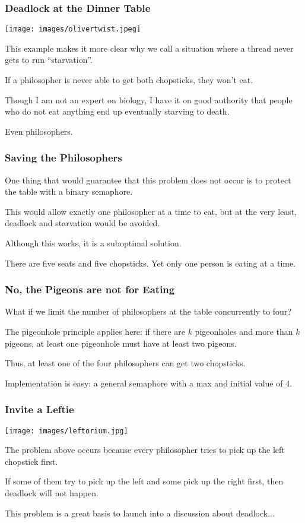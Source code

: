 \begin{frame}
	\frametitle{Deadlock at the Dinner Table}

	\begin{center}
		\texttt{[image: images/olivertwist.jpeg]}
	\end{center}

	This example makes it more clear why we call a situation where a thread never gets to run ``starvation''.

	If a philosopher is never able to get both chopsticks, they won't eat.

	Though I am not an expert on biology, I have it on good authority that people who do not eat anything end up eventually starving to death.

	Even philosophers.

\end{frame}

\begin{frame}
	\frametitle{Saving the Philosophers}

	One thing that would guarantee that this problem does not occur is to protect the table with a binary semaphore.

	This would allow exactly one philosopher at a time to eat, but at the very least, deadlock and starvation would be avoided.

	Although this works, it is a suboptimal solution.

	There are five seats and five chopsticks. Yet only one person is eating at a time.

\end{frame}


\begin{frame}
	\frametitle{No, the Pigeons are not for Eating}

	What if we limit the number of philosophers at the table concurrently to four?

	The pigeonhole principle applies here: if there are $k$ pigeonholes and more than $k$ pigeons, at least one pigeonhole must have at least two pigeons.

	Thus, at least one of the four philosophers can get two chopsticks.

	Implementation is easy: a general semaphore with a max and initial value of 4.

\end{frame}

\begin{frame}
	\frametitle{Invite a Leftie}

	\begin{center}
		\texttt{[image: images/leftorium.jpg]}
	\end{center}

	The problem above occurs because every philosopher tries to pick up the left chopstick first.

	If some of them try to pick up the left and some pick up the right first, then deadlock will not happen.

	This problem is a great basis to launch into a discussion about deadlock...

\end{frame}



